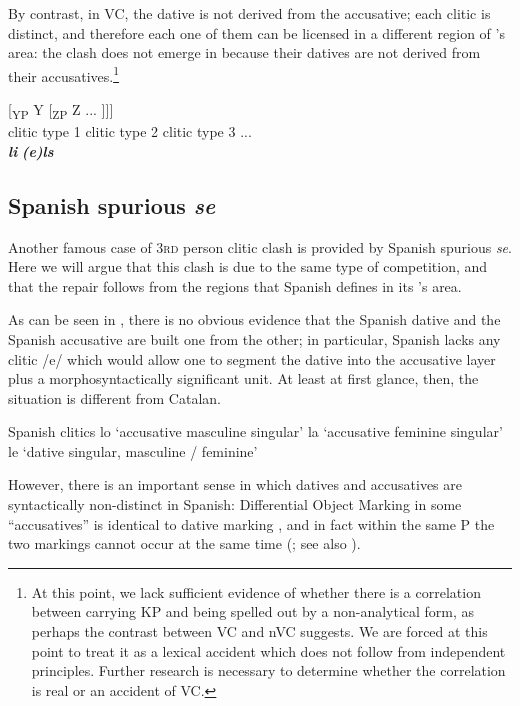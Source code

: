 \documentclass[output=paper,modfonts,nonflat,newtxmath,colorlinks,citecolor=brown]{langsci/langscibook}
\begin{document}
    \z

By contrast, in VC, the dative is not derived from the accusative; each clitic is distinct, and therefore each one of them can be licensed in a different region of \citeauthor{Sportiche1996}’s area: the clash does not emerge in  because their datives are not derived from their accusatives.\footnote{At this point, we lack sufficient evidence of whether there is a correlation between carrying KP and being spelled out by a non-analytical form, as perhaps the contrast between VC and nVC suggests. We are forced at this point to treat it as a lexical accident which does not follow from independent principles. Further research is necessary to determine whether the correlation is real or an accident of VC.}

\ea%
    \label{ex:cabre:17}
    \gll {[\textsubscript{XP} X} { } {[\textsubscript{YP} Y} { } {[\textsubscript{ZP}  Z} ...  ]]]\\
    \footnotesize {clitic type 1} { } \footnotesize {clitic type 2} { }  \footnotesize   {clitic type 3} ...\\
    \glt \textbf{\textit{li}} \textbf{\textit{(e)ls}}
	\z

\subsection{Spanish spurious \textit{se}}
\label{sec:cabre:3.2}

An\-\-\-other famous case of \textsc{3rd} person clitic clash is provided by Spanish spurious \textit{se}. Here we will argue that this clash is due to the same type of competition, and that the repair follows from the regions that Spanish defines in its \citeauthor{Sportiche1996}’s area.

As can be seen in , there is no obvious evidence that the Spanish dative and the Spanish accusative are built one from the other; in particular, Spanish lacks any clitic /e/ which would allow one to segment the dative into the accusative layer plus a morphosyntactically significant unit. At least at first glance, then, the situation is different from Catalan.

\ea%
	 Spanish clitics
    \label{ex:cabre:18}
    \ea lo ‘accusative masculine singular’
    \ex la ‘accusative feminine singular’
    \ex le ‘dative singular, masculine / feminine’
    \z
    \z



However, there is an important sense in which datives and accusatives are syntactically non-distinct in Spanish: Differential Object Marking in some ``accusatives'' is identical to dative marking , and in fact within the same {\liv}P the two markings cannot occur at the same time  (\citealt{OrmazabalRomero2013Probus}; see also ).
\end{document}

